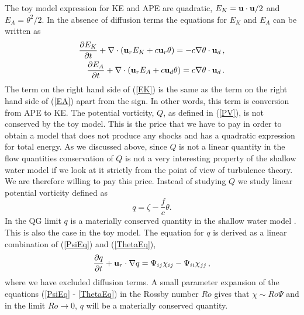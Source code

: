 The toy model expression for  KE and APE are quadratic,   $ E_K = {\bf u}\cdot {\bf u}/2 $ and $ E_A = \theta^2/2 $.
In the absence of diffusion terms the equations for $ E_K $ and $ E_A $ can be written as
\begin{eqnarray} \label{EK}
\frac{\partial{E_K}} {\partial t} + \nabla \cdot ({\bf u}_rE_K+ c{\bf u}_r \theta) = - c \nabla \theta \cdot {\bf u}_d  \, , \\ \label{EA}
\frac{\partial{E_A}} {\partial t} + \nabla \cdot ({\bf u}_rE_A + c{\bf u}_d  \theta) =  c \nabla \theta \cdot {\bf u}_d \, .
\end{eqnarray}
 The term on the right hand side of  (\ref{EK}) is the same as the term on the right hand side of (\ref{EA}) apart from the sign. In other words, this term is conversion from APE to KE.
The potential vorticity, $ Q $,  as defined in (\ref{PV}), is not conserved by the toy model. This is the price that we have to pay in order to obtain a model that does not produce any shocks and has a quadratic expression for total energy. As we discussed above, since $ Q $ is not a linear quantity in the flow quantities conservation of $ Q $  is not a very interesting property of the shallow water model if we look at it strictly from the point of view of turbulence theory.
We are therefore willing to pay this price. Instead of studying $ Q $ we study  linear potential vorticity  \citep{Dritschel2001} defined as
\begin{equation} \label{Linear}
q = \zeta - \frac{f}{c}\theta .
\end{equation}
In the QG limit $ q $ is a materially conserved quantity in the shallow water model \citep{Vallis:book}. This is also the case in the toy model.
The equation for $ q $ is derived as a linear combination of  (\ref{PsiEq}) and (\ref{ThetaEq}),
\begin{equation}
\frac{\partial q }{\partial t} + {\bf u}_r \cdot \nabla q  =  \Psi_{ij} \chi_{ij} - \Psi_{ii} \chi_{jj} \, ,
\end{equation}
where we have excluded diffusion terms. A small parameter expansion of  the equations (\ref{PsiEq} - \ref{ThetaEq}) in the Rossby number \citep{Vallis:book} $ Ro $ gives that $ \chi \sim Ro \Psi $ and in the limit $ Ro \rightarrow 0 $, $ q $ will be a materially conserved quantity.



